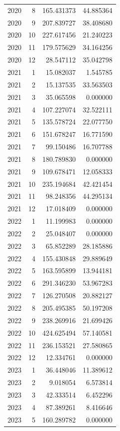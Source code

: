 \begin{tabular}{rrrr}
2020 & 8 & 165.431373 & 44.885364 \\
2020 & 9 & 207.839727 & 38.408680 \\
2020 & 10 & 227.617456 & 21.240223 \\
2020 & 11 & 179.575629 & 34.164256 \\
2020 & 12 & 28.547112 & 35.042798 \\
2021 & 1 & 15.082037 & 1.545785 \\
2021 & 2 & 15.137535 & 33.563503 \\
2021 & 3 & 35.065598 & 0.000000 \\
2021 & 4 & 107.227074 & 32.522111 \\
2021 & 5 & 135.578724 & 22.077750 \\
2021 & 6 & 151.678247 & 16.771590 \\
2021 & 7 & 99.150486 & 16.707788 \\
2021 & 8 & 180.789830 & 0.000000 \\
2021 & 9 & 109.678471 & 12.058333 \\
2021 & 10 & 235.194684 & 42.421454 \\
2021 & 11 & 98.248356 & 44.295134 \\
2021 & 12 & 17.018409 & 0.000000 \\
2022 & 1 & 11.199983 & 0.000000 \\
2022 & 2 & 25.048407 & 0.000000 \\
2022 & 3 & 65.852289 & 28.185886 \\
2022 & 4 & 155.430848 & 29.889649 \\
2022 & 5 & 163.595899 & 13.944181 \\
2022 & 6 & 291.346230 & 53.967283 \\
2022 & 7 & 126.270508 & 20.882127 \\
2022 & 8 & 205.495385 & 50.197208 \\
2022 & 9 & 238.269916 & 21.699426 \\
2022 & 10 & 424.625494 & 57.140581 \\
2022 & 11 & 236.153521 & 27.580865 \\
2022 & 12 & 12.334761 & 0.000000 \\
2023 & 1 & 36.448046 & 11.389612 \\
2023 & 2 & 9.018054 & 6.573814 \\
2023 & 3 & 42.333514 & 6.452296 \\
2023 & 4 & 87.389261 & 8.416646 \\
2023 & 5 & 160.289782 & 0.000000 \\

\end{tabular}
